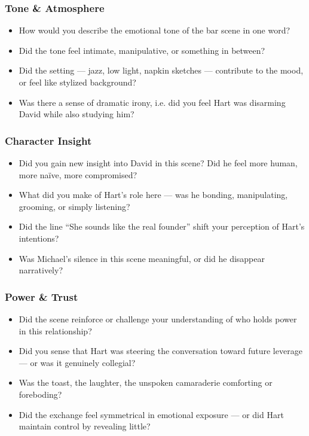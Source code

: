 \subsubsection{Tone \& Atmosphere}

\begin{itemize}
\item How would you describe the emotional tone of the bar scene in one word?
\item Did the tone feel intimate, manipulative, or something in between?
\item Did the setting — jazz, low light, napkin sketches — contribute to the mood, or feel like stylized background?
\item Was there a sense of dramatic irony, i.e. did you feel Hart was disarming David while also studying him?
\end{itemize}

\subsubsection{Character Insight}

\begin{itemize}
\item Did you gain new insight into David in this scene? Did he feel more human, more naïve, more compromised?
\item What did you make of Hart’s role here — was he bonding, manipulating, grooming, or simply listening?
\item Did the line “She sounds like the real founder” shift your perception of Hart’s intentions?
\item Was Michael’s silence in this scene meaningful, or did he disappear narratively?
\end{itemize}

\subsubsection{Power \& Trust}

\begin{itemize}
\item Did the scene reinforce or challenge your understanding of who holds power in this relationship?
\item Did you sense that Hart was steering the conversation toward future leverage — or was it genuinely collegial?
\item Was the toast, the laughter, the unspoken camaraderie comforting or foreboding?
\item Did the exchange feel symmetrical in emotional exposure — or did Hart maintain control by revealing little?
\end{itemize}

